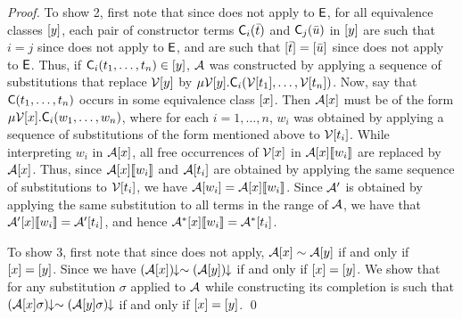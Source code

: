\begin{proof}
To show 2, 
first note that since  does not apply to $\mathsf{E}$,
for all equivalence classes $[ y ]$,
each pair of constructor terms $\textsf{C}_i( \bar t )$ and $\textsf{C}_j( \bar u )$ in $[ y ]$
are such that $i = j$ since  does not apply to $\mathsf{E}$,
and are such that $[  \bar t  ] = [  \bar u  ]$ since  does not apply to $\mathsf{E}$.
Thus, 
if $\textsf{C}_i( t_1, \ldots, t_n ) \in [ y ]$,
$\mathcal{A}$ was constructed by applying a sequence of substitutions
that replace $\mathcal{V}{[ y ]}$ by $\mu \mathcal{V}{[ y ]}. \textsf{C}_i( \mathcal{V}{[ t_1 ]}, \ldots, \mathcal{V}{[ t_n ]} )$.
Now, say that $\textsf{C}( t_1, \ldots, t_n )$ occurs in some equivalence class $[ x ]$.
Then $\mathcal{A} [ x ]$ must be of the form $\mu \mathcal{V}{[ x ]}. \textsf{C}_i( w_1, \ldots, w_n )$,
where for each $i=1,\ldots,n$, $w_i$ was obtained by applying a sequence of substitutions
of the form mentioned above to $\mathcal{V}{[ t_i ]}$.
While interpreting $w_i$ in $\mathcal{A} [ x ]$,
all free occurrences of $\mathcal{V}{[ x ]}$ in $\mathcal{A} [ x ] [\![ w_i ]\!]$ are replaced by $\mathcal{A} [ x ]$. 
Thus, since $\mathcal{A} [ x ] [\![ w_i ]\!]$ and $\mathcal{A} [ t_i ]$ are obtained by applying the same sequence of substitutions to $\mathcal{V}{[ t_i ]}$,
we have $\mathcal{A} [ w_i ] = \mathcal{A} [ x ] [\![  w_i  ]\!]$.
Since $\mathcal{A}'$ is obtained by applying the same substitution to all terms in the range of $\mathcal{A}$,
we have that $\mathcal{A}' [ x ] [\![ w_i ]\!] = \mathcal{A}' [ t_i ]$,
and hence $\mathcal{A}^\ast [ x ] [\![ w_i ]\!] = \mathcal{A}^\ast [ t_i ]$.

To show 3,
first note that since  does not apply,
$\mathcal{A} [ x ] \sim \mathcal{A} [ y ]$ if and only if $[ x ] = [ y ]$.
Since 
we have ${(\mathcal{A} [ x ])}\!\!\downarrow \sim {(\mathcal{A} [ y ] )}\!\!\downarrow$ if and only if $[ x ] = [ y ]$.
We show that for any substitution $\sigma$ applied to $\mathcal{A}$ while constructing its completion is such that
${(\mathcal{A} [ x ] \sigma)}\!\!\downarrow \sim {(\mathcal{A} [ y ]  \sigma)}\!\!\downarrow$ if and only if $[ x ] = [ y ]$.
\qed
\end{proof}

